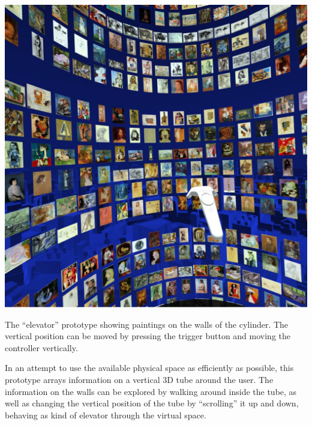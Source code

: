 \documentclass{tufte-book} %
\begin{document}
\begin{marginfigure}
  \includegraphics[width=\linewidth]{picassoinside.jpg}
  \caption{The ``elevator'' prototype showing paintings on the walls of the cylinder. The vertical position can be moved by pressing the trigger button and moving the controller vertically.}
  \label{fig:picassoinside}
\end{marginfigure}

In an attempt to use the available physical space as efficiently as possible, this prototype arrays information on a vertical 3D tube around the user. The information on the walls can be explored by walking around inside the tube, as well as changing the vertical position of the tube by ``scrolling'' it up and down, behaving as kind of elevator through the virtual space.
\end{document}
